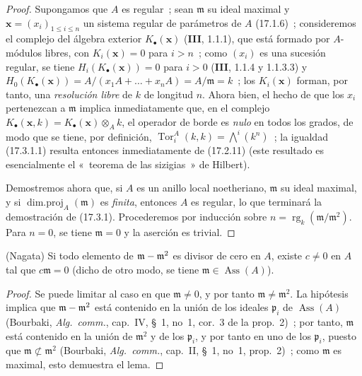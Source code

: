 \begin{proof}
Supongamos que $A$ es regular~; sean $\mathfrak{m}$ su ideal maximal y
$\mathbf{x}=(x_i)_{1\leq i\leq n}$ un sistema regular de parámetros de $A$
(17.1.6)~; consideremos el complejo del álgebra exterior
$K_\bullet(\mathbf{x})$ (\textbf{III}, 1.1.1), que está formado por $A$-módulos
libres, con $K_i(\mathbf{x})=0$ para $i>n$~; como $(x_i)$ es una sucesión
regular, se tiene $H_i(K_\bullet(\mathbf{x}))=0$ para $i>0$ (\textbf{III},
1.1.4 y 1.1.3.3) y
$H_0(K_\bullet(\mathbf{x}))=A/(x_1A+\ldots+x_nA)=A/\mathfrak{m}=k$~; los
$K_i(\mathbf{x})$ forman, por tanto, una \emph{resolución libre} de $k$ de
longitud $n$. Ahora bien, el hecho de que los $x_i$ pertenezcan a $\mathfrak{m}$
implica inmediatamente que, en el complejo
$K_\bullet(\mathbf{x},k)=K_\bullet(\mathbf{x})\otimes_A k$, el operador de borde
es \emph{nulo} en todos los grados, de modo que se tiene, por definición,
$\operatorname{Tor}^A_i(k,k)=\bigwedge^i(k^n)$~; la igualdad (17.3.1.1) resulta
entonces inmediatamente de (17.2.11) (este resultado es esencialmente el «~teorema de las
sizigias~» de Hilbert).

Demostremos ahora que, si $A$ es un anillo local noetheriano,
$\mathfrak{m}$ su ideal maximal, y si
$\operatorname{dim.proj}_A(\mathfrak{m})$ es \emph{finita}, entonces $A$ es
regular, lo que terminará la demostración de (17.3.1). Procederemos por
inducción sobre $n=\operatorname{rg}_k(\mathfrak{m}/\mathfrak{m}^2)$. Para
$n=0$, se tiene $\mathfrak{m}=0$ y la aserción es trivial.
\end{proof}

\begin{lemma}[17.3.1.2]
\label{0.17.3.1.2-fr}
\textnormal{(Nagata)} Si todo elemento de
$\mathfrak{m}-\mathfrak{m}^2$ es divisor de cero en $A$, existe
$c\neq0$ en $A$ tal que $c\mathfrak{m}=0$ (dicho de otro modo, se tiene
$\mathfrak{m}\in\operatorname{Ass}(A)$).
\end{lemma}

\begin{proof}
Se puede limitar al caso en que $\mathfrak{m}\neq0$, y por tanto
$\mathfrak{m}\neq\mathfrak{m}^2$. La hipótesis implica que
$\mathfrak{m}-\mathfrak{m}^2$ está contenido en la unión de los ideales
$\mathfrak{p}_i$ de $\operatorname{Ass}(A)$ (Bourbaki,
\emph{Alg.~comm.}, cap.~IV, \S~1, no~1, cor.~3 de la prop.~2)~; por tanto,
$\mathfrak{m}$ está contenido en la unión de $\mathfrak{m}^2$
y de los $\mathfrak{p}_i$, y por tanto en uno de los $\mathfrak{p}_i$, puesto que
$\mathfrak{m}\not\subset\mathfrak{m}^2$ (Bourbaki, \emph{Alg.~comm.},
cap.~II, \S~1, no~1, prop.~2)~; como $\mathfrak{m}$ es maximal, esto demuestra el
lema.
\end{proof}

